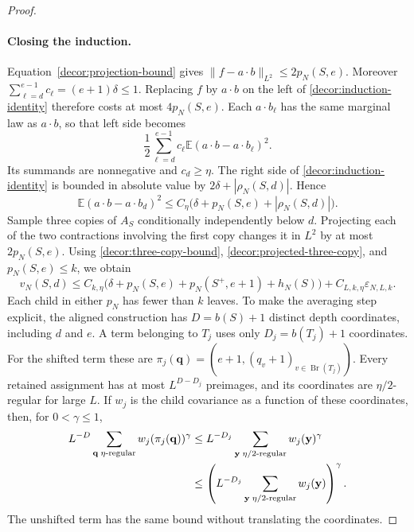 \begin{proof}
\paragraph{Closing the induction.}
Equation~\eqref{decor:projection-bound} gives
$\|f-a\cdot b\|_{L^2}\le2p_N(S,e)$.
Moreover
$\sum_{\ell=d}^{e-1}c_\ell=(e+1)\delta\le1$.
Replacing $f$ by $a\cdot b$ on the left of
\eqref{decor:induction-identity} therefore costs at most
$4p_N(S,e)$.  Each $a\cdot b_\ell$ has the same marginal law as
$a\cdot b$, so that left side becomes
\[
 \frac12\sum_{\ell=d}^{e-1}c_\ell
        \mathbb E(a\cdot b-a\cdot b_\ell)^2.
\]
Its summands are nonnegative and $c_d\ge\eta$.  The right side
of \eqref{decor:induction-identity} is bounded in absolute value
by $2\delta+|\rho_N(S,d)|$.  Hence
\begin{equation}
 \mathbb E(a\cdot b-a\cdot b_d)^2
 \le C_\eta\bigl(\delta+p_N(S,e)+|\rho_N(S,d)|\bigr).
 \label{decor:projected-three-copy}
\end{equation}
Sample three copies of $A_S$ conditionally independently below
$d$.  Projecting each of the two contractions involving the
first copy changes it in $L^2$ by at most $2p_N(S,e)$.
Using \eqref{decor:three-copy-bound},
\eqref{decor:projected-three-copy}, and $p_N(S,e)\le k$, we obtain
\begin{equation}
 v_N(S,d)\le C_{k,\eta}\bigl(
       \delta+p_N(S,e)+p_N(S^+,e+1)+h_N(S)\bigr)
       +C_{L,k,\eta}\varepsilon_{N,L,k}.
 \label{decor:covariance-induction-estimate}
\end{equation}
Each child in either $p_N$ has fewer than $k$ leaves. To make the
averaging step explicit, the aligned construction has
$D=b(S)+1$ distinct depth coordinates, including $d$ and $e$.
A term belonging to $T_j$ uses only $D_j=b(T_j)+1$ coordinates.
For the shifted term these are
$\pi_j(\mathbf q)=(e+1,(q_v+1)_{v\in\operatorname{Br}(T_j)})$.
Every retained assignment has at most $L^{D-D_j}$ preimages, and its
coordinates are $\eta/2$-regular for large $L$. If $w_j$ is the child
covariance as a function of these coordinates, then, for $0<\gamma\le1$,
\begin{align}
 L^{-D}\sum_{\mathbf q\;\eta\text{-regular}}
       w_j(\pi_j(\mathbf q))^\gamma
 &\le L^{-D_j}\sum_{\mathbf y\;\eta/2\text{-regular}}w_j(\mathbf y)^\gamma
 \notag\\
 &\le\left(L^{-D_j}\sum_{\mathbf y\;\eta/2\text{-regular}}
       w_j(\mathbf y)\right)^\gamma.
 \label{decor:fiber-bound}
\end{align}
The unshifted term has the same bound without translating the coordinates.

\end{proof}
